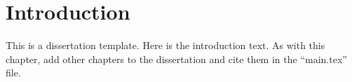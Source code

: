 \chapter{Introduction}
\label{chpt:chpt4}

This is a dissertation template. Here is the introduction text. As with this chapter, add other chapters to the dissertation and cite them in the ``main.tex'' file.



\blindtext[3]